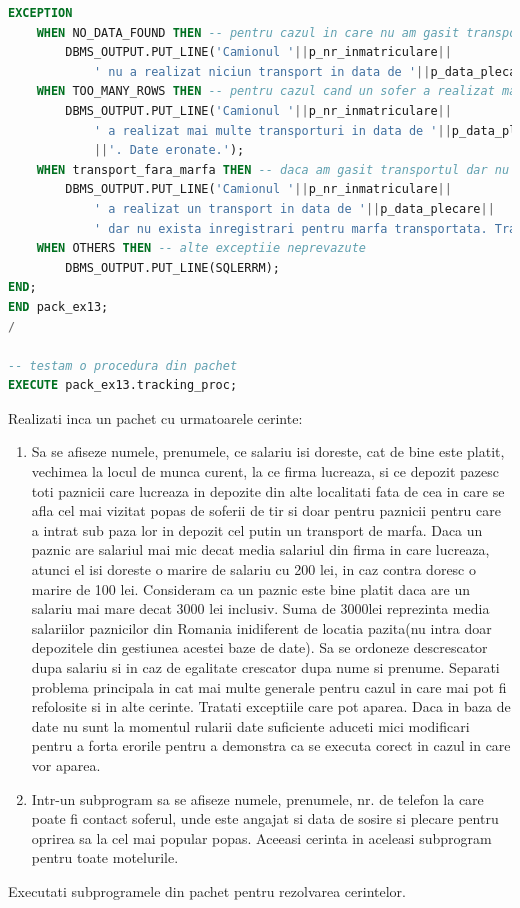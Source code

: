 \documentclass[12pt, a4paper]{article}
\begin{document}
\begin{lstlisting}[language=SQL]
EXCEPTION
    WHEN NO_DATA_FOUND THEN -- pentru cazul in care nu am gasit transportul
        DBMS_OUTPUT.PUT_LINE('Camionul '||p_nr_inmatriculare||
            ' nu a realizat niciun transport in data de '||p_data_plecare);
    WHEN TOO_MANY_ROWS THEN -- pentru cazul cand un sofer a realizat mai multe transporturi intr-o zi
        DBMS_OUTPUT.PUT_LINE('Camionul '||p_nr_inmatriculare||
            ' a realizat mai multe transporturi in data de '||p_data_plecare
            ||'. Date eronate.');
    WHEN transport_fara_marfa THEN -- daca am gasit transportul dar nu si marfa
        DBMS_OUTPUT.PUT_LINE('Camionul '||p_nr_inmatriculare||
            ' a realizat un transport in data de '||p_data_plecare||
            ' dar nu exista inregistrari pentru marfa transportata. Transport invalid.');
    WHEN OTHERS THEN -- alte exceptiie neprevazute
        DBMS_OUTPUT.PUT_LINE(SQLERRM);
END;
END pack_ex13;
/

-- testam o procedura din pachet
EXECUTE pack_ex13.tracking_proc;
\end{lstlisting}

Realizati inca un pachet cu urmatoarele cerinte:
\begin{enumerate}
    \item
          Sa se afiseze numele, prenumele, ce salariu isi doreste, cat de bine este
          platit, vechimea la locul de munca curent, la ce firma lucreaza, si ce
          depozit pazesc toti paznicii care lucreaza in depozite din alte localitati
          fata de cea in care se afla cel mai vizitat popas de soferii de tir si doar
          pentru paznicii pentru care a intrat sub paza lor in depozit cel putin un
          transport de marfa. Daca un paznic are salariul mai mic decat media salariul
          din firma in care lucreaza, atunci el isi doreste o marire de salariu cu 200
          lei, in caz contra doresc o marire de 100 lei. Consideram ca un paznic este
          bine platit daca are un salariu mai mare decat 3000 lei inclusiv. Suma de
          3000lei reprezinta media salariilor paznicilor din Romania inidiferent de
          locatia pazita(nu intra doar depozitele din gestiunea acestei baze de date).
          Sa se ordoneze descrescator dupa salariu si in caz de egalitate crescator
          dupa nume si prenume. Separati problema principala in cat mai multe generale
          pentru cazul in care mai pot fi refolosite si in alte cerinte.
          Tratati exceptiile care pot aparea. Daca in baza de date nu sunt la momentul
          rularii date suficiente aduceti mici modificari pentru a forta erorile pentru
          a demonstra ca se executa corect in cazul in care vor aparea.
    \item
          Intr-un subprogram sa se afiseze numele, prenumele, nr. de telefon la care
          poate fi contact soferul, unde este angajat si data de sosire si plecare
          pentru oprirea sa la cel mai popular popas. Aceeasi cerinta in aceleasi
          subprogram pentru toate motelurile.
\end{enumerate}
Executati subprogramele din pachet pentru rezolvarea cerintelor.
\end{document}
